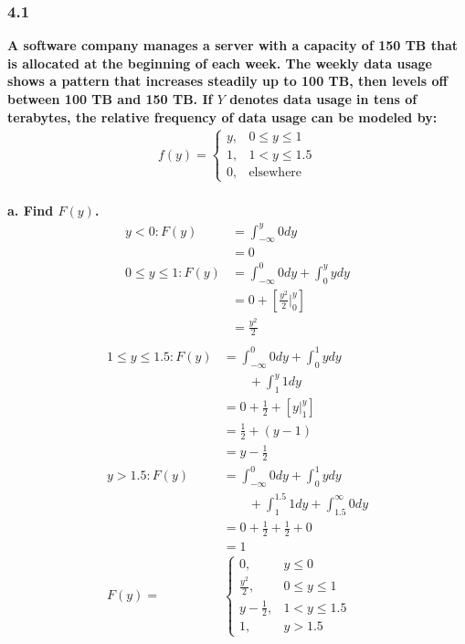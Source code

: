 \documentclass[
	a4paper, %
	10pt, %
	unnumberedsections, %
	twoside, %
]{LTJournalArticle}
\begin{document}
\subsubsection{4.1}
\textbf{A software company manages a server with a capacity of 150 TB that is allocated at the beginning of each week. The weekly data usage shows a pattern that increases steadily up to 100 TB, then levels off between 100 TB and 150 TB. If $Y$ denotes data usage in tens of terabytes, the relative frequency of data usage can be modeled by: }
\begin{equation*}
    \begin{aligned}
        f(y) =
        \begin{cases}
            y, & 0 \le y \le 1 \\
            1, & 1 < y \le 1.5 \\
            0, & \text{elsewhere}
        \end{cases}
    \end{aligned}
\end{equation*} \\
\textbf{a. Find $F(y)$.} \\
\begin{equation*}
    \begin{aligned}
        y < 0: F(y) &= \int^y_{-\infty} 0dy \\
            &= 0 \\
        0 \le y \le 1: F(y) &= \int^0_{-\infty} 0dy + \int^y_0 ydy \\
            &= 0 + \left[ \frac{y^2}{2}\Biggr|^y_0 \right] \\
            &= \frac{y^2}{2} \\
    \end{aligned}
\end{equation*}
\begin{equation*}
    \begin{aligned}
        1 \le y \le 1.5: F(y) &= \int^0_{-\infty} 0dy + \int^1_0 ydy \\ &{\quad \quad} + \int^y_1 1dy \\
            &= 0 + \frac{1}{2} + \left[ y\Bigr|^y_1 \right] \\
            &= \frac{1}{2} + (y - 1) \\
            &= y - \frac{1}{2} \\
        y > 1.5: F(y) &= \int^0_{-\infty} 0dy + \int^1_0 ydy \\ &{\quad \quad} + \int^{1.5}_1 1dy + \int^{\infty}_{1.5} 0dy \\
            &= 0 + \frac{1}{2} + \frac{1}{2} + 0 \\
            &= 1 \\
        F(y) =
        &\begin{cases}
            0, & y \le 0 \\
            \frac{y^2}{2}, & 0 \le y \le 1 \\
            y - \frac{1}{2}, & 1 < y \le 1.5 \\
            1, & y > 1.5
        \end{cases}
    \end{aligned}
\end{equation*}
\end{document}
